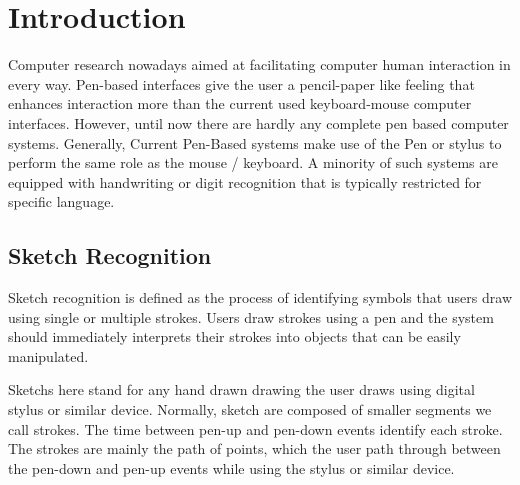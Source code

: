 \chapter {Introduction}

Computer research nowadays aimed at facilitating computer human interaction in every way. Pen-based interfaces give the user a pencil-paper like feeling that enhances interaction more than the current used keyboard-mouse computer interfaces. However, until now there are hardly any complete pen based computer systems. Generally, Current Pen-Based systems make use of the Pen or stylus to perform the same role as the mouse / keyboard. A minority of such systems are equipped with handwriting or digit recognition that is typically restricted for specific language. 

\section{Sketch Recognition}
Sketch recognition is defined as the process of identifying symbols that users draw using single or multiple strokes. Users draw strokes using a pen and the system should immediately interprets their strokes into objects that can be easily manipulated.

Sketchs here stand for any hand drawn drawing the user draws using digital stylus or similar device. Normally, sketch are composed of smaller segments we call strokes. The time between pen-up and pen-down events identify each stroke.  The strokes are mainly the path of points, which the user path through between the pen-down and pen-up events while using the stylus or similar device. 

 
 
